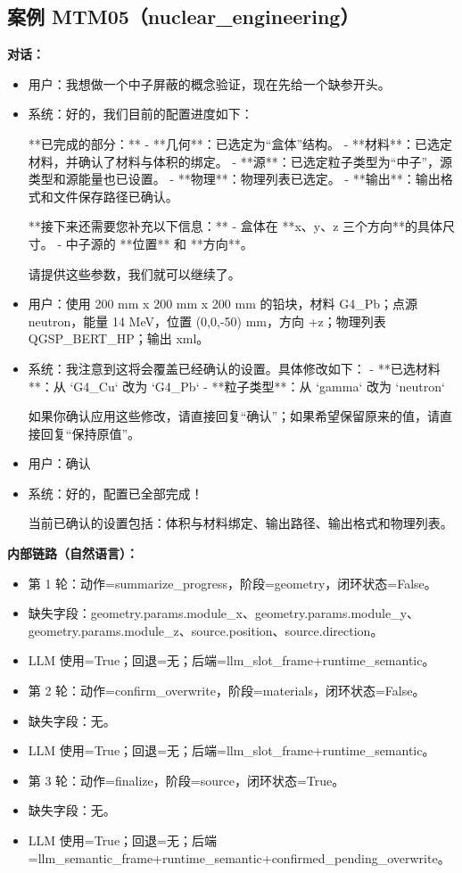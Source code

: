 \documentclass[11pt]{ctexart}
\begin{document}
\subsection{案例 MTM05（nuclear\_engineering）}
\textbf{对话：}
\begin{itemize}
\item 用户：我想做一个中子屏蔽的概念验证，现在先给一个缺参开头。
\item 系统：好的，我们目前的配置进度如下：

**已完成的部分：**
- **几何**：已选定为“盒体”结构。
- **材料**：已选定材料，并确认了材料与体积的绑定。
- **源**：已选定粒子类型为“中子”，源类型和源能量也已设置。
- **物理**：物理列表已选定。
- **输出**：输出格式和文件保存路径已确认。

**接下来还需要您补充以下信息：**
- 盒体在 **x、y、z 三个方向**的具体尺寸。
- 中子源的 **位置** 和 **方向**。

请提供这些参数，我们就可以继续了。
\item 用户：使用 200 mm x 200 mm x 200 mm 的铅块，材料 G4\_Pb；点源 neutron，能量 14 MeV，位置 (0,0,-50) mm，方向 +z；物理列表 QGSP\_BERT\_HP；输出 xml。
\item 系统：我注意到这将会覆盖已经确认的设置。具体修改如下：
- **已选材料**：从 `G4\_Cu` 改为 `G4\_Pb`
- **粒子类型**：从 `gamma` 改为 `neutron`

如果你确认应用这些修改，请直接回复“确认”；如果希望保留原来的值，请直接回复“保持原值”。
\item 用户：确认
\item 系统：好的，配置已全部完成！

当前已确认的设置包括：体积与材料绑定、输出路径、输出格式和物理列表。
\end{itemize}
\textbf{内部链路（自然语言）：}
\begin{itemize}
\item 第 1 轮：动作=summarize\_progress，阶段=geometry，闭环状态=False。
\item 缺失字段：geometry.params.module\_x、geometry.params.module\_y、geometry.params.module\_z、source.position、source.direction。
\item LLM 使用=True；回退=无；后端=llm\_slot\_frame+runtime\_semantic。
\item 第 2 轮：动作=confirm\_overwrite，阶段=materials，闭环状态=False。
\item 缺失字段：无。
\item LLM 使用=True；回退=无；后端=llm\_slot\_frame+runtime\_semantic。
\item 第 3 轮：动作=finalize，阶段=source，闭环状态=True。
\item 缺失字段：无。
\item LLM 使用=True；回退=无；后端=llm\_semantic\_frame+runtime\_semantic+confirmed\_pending\_overwrite。
\end{itemize}
\end{document}
